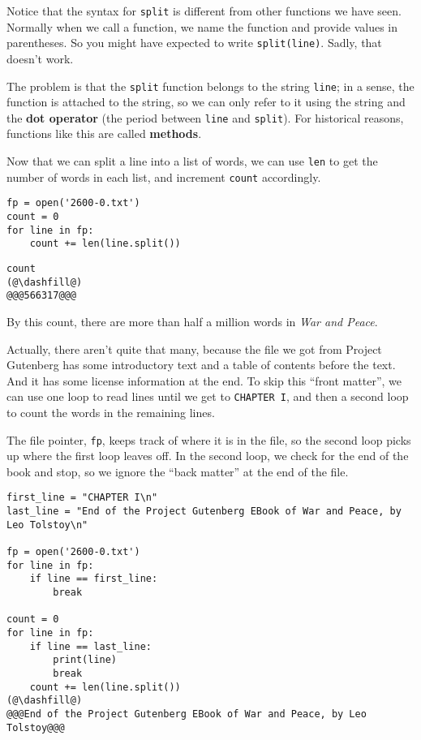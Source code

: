Notice that the syntax for \passthrough{\lstinline!split!} is different
from other functions we have seen. Normally when we call a function, we
name the function and provide values in parentheses. So you might have
expected to write \passthrough{\lstinline!split(line)!}. Sadly, that
doesn't work.

The problem is that the \passthrough{\lstinline!split!} function belongs
to the string \passthrough{\lstinline!line!}; in a sense, the function
is attached to the string, so we can only refer to it using the string
and the \textbf{dot operator} (the period between
\passthrough{\lstinline!line!} and \passthrough{\lstinline!split!}). For
historical reasons, functions like this are called \textbf{methods}.

Now that we can split a line into a list of words, we can use
\passthrough{\lstinline!len!} to get the number of words in each list,
and increment \passthrough{\lstinline!count!} accordingly.

\begin{lstlisting}[]
fp = open('2600-0.txt')
count = 0
for line in fp:
    count += len(line.split())
\end{lstlisting}

\begin{lstlisting}[]
count
(@\dashfill@)
@@@566317@@@
\end{lstlisting}

By this count, there are more than half a million words in \emph{War and
Peace}.

Actually, there aren't quite that many, because the file we got from
Project Gutenberg has some introductory text and a table of contents
before the text. And it has some license information at the end. To skip
this ``front matter'', we can use one loop to read lines until we get to
\passthrough{\lstinline!CHAPTER I!}, and then a second loop to count the
words in the remaining lines.

The file pointer, \passthrough{\lstinline!fp!}, keeps track of where it
is in the file, so the second loop picks up where the first loop leaves
off. In the second loop, we check for the end of the book and stop, so
we ignore the ``back matter'' at the end of the file.

\begin{lstlisting}[]
first_line = "CHAPTER I\n"
last_line = "End of the Project Gutenberg EBook of War and Peace, by Leo Tolstoy\n"

fp = open('2600-0.txt')
for line in fp:
    if line == first_line:
        break

count = 0
for line in fp:
    if line == last_line:
        print(line)
        break
    count += len(line.split())
(@\dashfill@)
@@@End of the Project Gutenberg EBook of War and Peace, by Leo Tolstoy@@@
\end{lstlisting}


